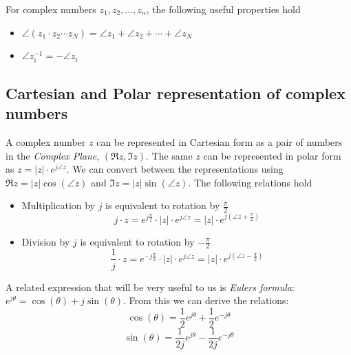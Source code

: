 For complex numbers $z_1, z_2, \ldots, z_n$, the following useful properties hold
\begin{itemize}
\item $\angle \left(z_1\cdot z_2 \cdots z_N\right) = \angle z_1 + \angle z_2 + \cdots + \angle z_N$
\item $\angle z_i^{-1} = -\angle z_i$
\end{itemize}

\subsection*{Cartesian and Polar representation of complex numbers}

A complex number $z$ can be represented in Cartesian form as a pair of numbers in the \textit{Complex Plane}, $(\Re{z},\Im{z})$. The same $z$ can be represented in polar form as $z = |z|\cdot e^{j\angle z}$. We can convert between the representations using  $\Re{z} = |z| \cos(\angle z)$ and $\Im{z} = |z| \sin(\angle z)$. The following relations hold

\begin{itemize}
\item Multiplication by $j$ is equivalent to rotation by $\tfrac{\pi}{2}$
\[
j\cdot z = e^{j\tfrac{\pi}{2}}\cdot |z|\cdot e^{j\angle z} = |z|\cdot e^{j(\angle z + \tfrac{\pi}{2})} 
\]
\item Division by $j$ is equivalent to rotation by $- \tfrac{\pi}{2}$
\[
\frac{1}{j}\cdot z = e^{-j\tfrac{\pi}{2}}\cdot |z|\cdot e^{j\angle z} = |z|\cdot e^{j(\angle z - \tfrac{\pi}{2})} 
\]
\end{itemize}

A related expression that will be very useful to us is \textit{Eulers formula}: $e^{j\theta} = \cos(\theta) + j\sin(\theta)$. From this we can derive the relations:
\[
\cos(\theta) = \frac{1}{2} e^{j\theta} + \frac{1}{2} e^{-j\theta} 
\]
\[
\sin(\theta) = \frac{1}{2j} e^{j\theta} - \frac{1}{2j} e^{-j\theta} 
\]

